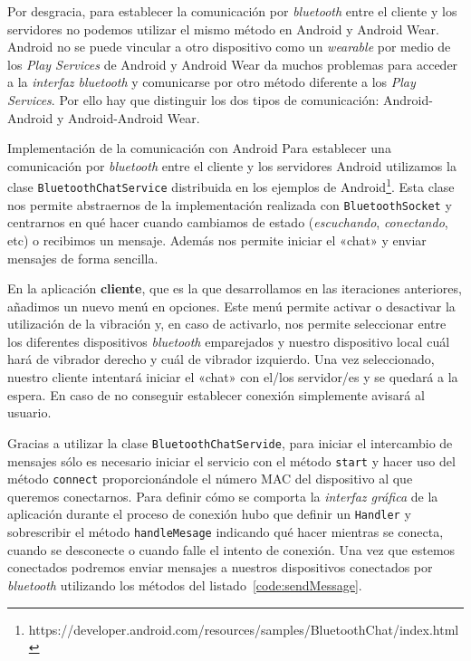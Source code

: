 Por desgracia, para establecer la comunicación por \emph{bluetooth} entre el cliente y los
servidores no podemos utilizar el mismo método en Android y Android Wear. Android no se puede
vincular a otro dispositivo como un \emph{wearable} por medio de los \emph{Play Services} de Android
y Android Wear da muchos problemas para acceder a la \emph{interfaz bluetooth} y comunicarse por
otro método diferente a los \emph{Play Services}. Por ello hay que distinguir los dos tipos de
comunicación: Android-Android y Android-Android Wear.

\begin{definitionlist}
  \item[Implementación de la comunicación con Android] Para establecer una comunicación por
    \emph{bluetooth} entre el cliente y los servidores Android utilizamos la clase
    \texttt{BluetoothChatService} distribuida en los ejemplos de
    Android\footnote{https://developer.android.com/resources/samples/BluetoothChat/index.html}. Esta
    clase nos permite abstraernos de la implementación realizada con \texttt{BluetoothSocket} y
    centrarnos en qué hacer cuando cambiamos de estado (\emph{escuchando}, \emph{conectando}, etc) o
    recibimos un mensaje. Además nos permite iniciar el «chat» y enviar mensajes de forma sencilla.

    En la aplicación \textbf{cliente}, que es la que desarrollamos en las iteraciones anteriores,
    añadimos un nuevo menú en opciones. Este menú permite activar o desactivar la utilización de la
    vibración y, en caso de activarlo, nos permite seleccionar entre los diferentes dispositivos
    \emph{bluetooth} emparejados y nuestro dispositivo local cuál hará de vibrador derecho y cuál de
    vibrador izquierdo. Una vez seleccionado, nuestro cliente intentará iniciar el «chat» con el/los
    servidor/es y se quedará a la espera. En caso de no conseguir establecer conexión simplemente
    avisará al usuario.

    Gracias a utilizar la clase \texttt{BluetoothChatServide}, para iniciar el intercambio de
    mensajes sólo es necesario iniciar el servicio con el método \texttt{start} y hacer uso del
    método \texttt{connect} proporcionándole el número \acf{MAC} del dispositivo al que queremos
    conectarnos. Para definir cómo se comporta la \emph{interfaz gráfica } de la aplicación durante
    el proceso de conexión hubo que definir un \texttt{Handler} y sobrescribir el método
    \texttt{handleMesage} indicando qué hacer mientras se conecta, cuando se desconecte o cuando
    falle el intento de conexión. Una vez que estemos conectados podremos enviar mensajes a nuestros
    dispositivos conectados por \emph{bluetooth} utilizando los métodos del
    listado~\ref{code:sendMessage}.


\end{definitionlist}
